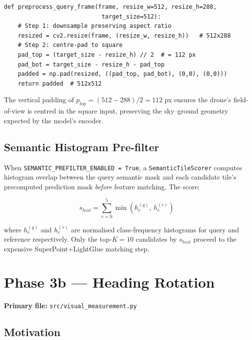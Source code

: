 \documentclass[12pt,a4paper]{article}
\begin{document}
\begin{lstlisting}[caption={Semantic preprocessing (image\_utils.py).}]
def preprocess_query_frame(frame, resize_w=512, resize_h=288,
                            target_size=512):
    # Step 1: downsample preserving aspect ratio
    resized = cv2.resize(frame, (resize_w, resize_h))   # 512x288
    # Step 2: centre-pad to square
    pad_top = (target_size - resize_h) // 2  # = 112 px
    pad_bot = target_size - resize_h - pad_top
    padded = np.pad(resized, ((pad_top, pad_bot), (0,0), (0,0)))
    return padded  # 512x512
\end{lstlisting}

The vertical padding of $p_{top} = (512 - 288)/2 = 112$ px ensures the
drone's field-of-view is centred in the square input, preserving the
sky--ground geometry expected by the model's encoder.

\subsection{Semantic Histogram Pre-filter}

When \texttt{SEMANTIC\_PREFILTER\_ENABLED = True}, a
\texttt{SemanticTileScorer} computes histogram overlap between the query
semantic mask and each candidate tile's precomputed prediction mask
\emph{before} feature matching. The score:

\begin{equation}
    s_{hist} = \sum_{c=0}^{5} \min(h^{(q)}_c,\, h^{(r)}_c)
    \label{eq:hist_score}
\end{equation}

where $h^{(q)}_c$ and $h^{(r)}_c$ are normalised class-frequency histograms
for query and reference respectively. Only the top-$K = 10$ candidates by
$s_{hist}$ proceed to the expensive SuperPoint+LightGlue matching step.

\section{Phase 3b --- Heading Rotation}

\noindent\textbf{Primary file:} \texttt{src/visual\_measurement.py}

\subsection{Motivation}
\end{document}
